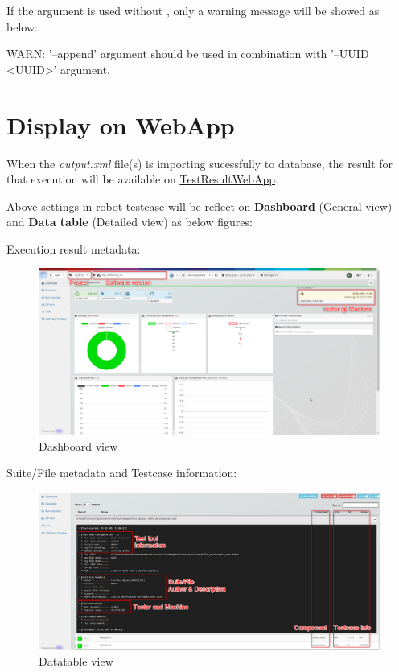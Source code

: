 If the argument  is used without , only a warning message 
will be showed as below:
\begin{robotlog}
WARN: '--append' argument should be used in combination with '--UUID <UUID>' argument.
\end{robotlog}


\newpage
\hypertarget{description-display-on-webapp}{%
\section{Display on WebApp}\label{description-display-on-webapp}}

When the \emph{output.xml} file(s) is importing sucessfully to database, the result for that 
execution will be available on
\href{https://github.com/test-fullautomation/testresultwebapp}{TestResultWebApp}.

Above settings in robot testcase will be reflect on \textbf{Dashboard} (General view) and 
\textbf{Data table} (Detailed view) as below figures:

Execution result metadata:

\begin{figure}[h!]
  \includegraphics[width=1\linewidth]{./pictures/Dashboard.png}
  \caption{Dashboard view}
\end{figure}

Suite/File metadata and Testcase information:

\begin{figure}[h!]
  \includegraphics[width=1\linewidth]{./pictures/Datatable.png}
  \caption{Datatable view}
\end{figure}